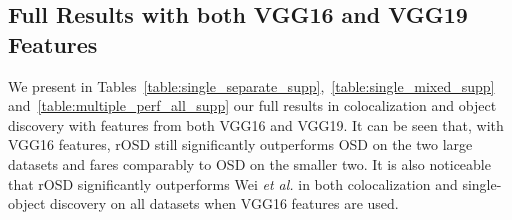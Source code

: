 \documentclass[runningheads]{llncs}
\begin{document}
\begin{table}[]
    \centering
    \caption{Influence of the ensemble method of Vo {\em et al.} on the colocalization performance of OSD and rOSD with our proposals}
    \label{table:em1}
\end{table}

\begin{table}[]
    \centering
    \caption{Influence of the ensemble method of Vo {\em et al.} on the single-object discovery performance of OSD and rOSD with our proposals}
    \label{table:em2}
\end{table}


\subsection{Full Results with both VGG16 and VGG19 Features}
We present in Tables~\ref{table:single_separate_supp},~\ref{table:single_mixed_supp} and~\ref{table:multiple_perf_all_supp} our full results in colocalization and object discovery with features from both VGG16 and VGG19. It can be seen that, with VGG16 features, rOSD still significantly outperforms OSD on the two large datasets and fares comparably to OSD on the smaller two. It is also noticeable that rOSD significantly outperforms Wei {\em et al.} in both colocalization and single-object discovery on all datasets when VGG16 features are used.
\end{document}
